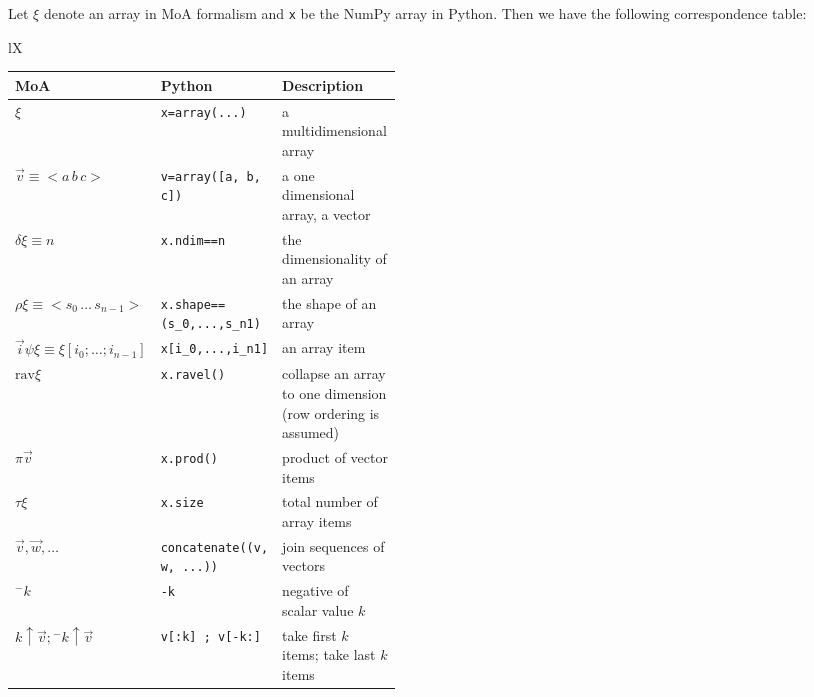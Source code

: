 \documentclass[a4paper,12pt]{article}
\newcommand{\dims}{\delta}
\newcommand{\shape}{\rho}
\newcommand{\size}{\tau}
\newcommand{\product}{\pi}
\newcommand{\ravel}{\mathrm{rav}}
\newcommand{\take}[2]{{#1 \uparrow #2}}
\newcommand{\minus}[1]{{}^{-}{#1}}
\begin{document}
Let $\xi$ denote an array in MoA formalism
and \verb|x| be the NumPy array in Python. Then we have the following
correspondence table:\\[2ex]
\begin{tabularx}{\textwidth}{lX}
\begin{tabular}[m]{l|l|m{0.45\linewidth}|}
  MoA & Python & Description \\\hline
  $\xi$ & \verb|x=array(...)| 
               & a multidimensional array\\
  $\vec v\equiv<a\, b\, c>$ & \verb|v=array([a, b, c])| 
               & a one dimensional array, a vector\\
  $\dims\xi\equiv n$ & \verb|x.ndim==n| 
               & the dimensionality of an array \\
  $\shape\xi\equiv<s_0\, \ldots\, s_{n-1}>$ & \verb|x.shape==(s_0,...,s_n1)| 
               & the shape of an array \\
  $\vec i\psi\xi\equiv\xi[i_0;\ldots;i_{n-1}]$ & \verb|x[i_0,...,i_n1]| 
               & an array item\\
  $\ravel \xi$ & \verb|x.ravel()| 
               & collapse an array to one dimension (row ordering is assumed)\\
  $\product\vec v$ & \verb|x.prod()| 
               & product of vector items\\
  $\size\xi$   & \verb|x.size| 
               & total number of array items\\
  $\vec v,\vec w,\ldots$ & \verb|concatenate((v, w, ...))|
               & join sequences of vectors\\
  $\minus k$ & \verb|-k| & negative of scalar value $k$\\
  $\take k{\vec v}; \take{\minus k}{\vec v} $&\verb|v[:k] ; v[-k:]|
               & take first $k$ items; take last $k$ items\\

                                                           
\end{tabular}  
\end{tabularx}
\end{document}
